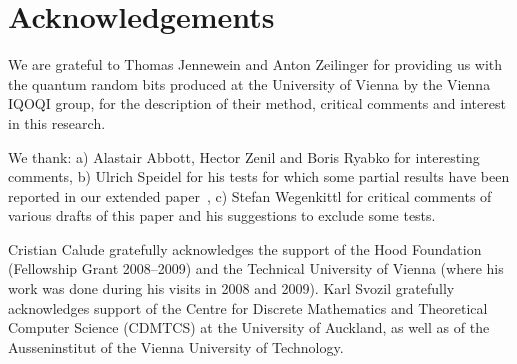 \documentclass[10pt]{article}%
\begin{document}
\section*{Acknowledgements}
We are grateful to  Thomas Jennewein and Anton Zeilinger for providing us with the quantum random bits produced at the University of Vienna by the Vienna IQOQI group, for the description of their method, critical comments and  interest in this research.

We thank: a) Alastair Abbott, Hector Zenil and Boris Ryabko for interesting comments, b)
Ulrich Speidel for his tests for which some partial results have been reported in our extended paper~\cite{CDMTCS372},
c) Stefan Wegenkittl for critical comments of various drafts of this paper and his suggestions  to exclude  some tests.


Cristian Calude gratefully  acknowledges the support of  the Hood Foundation (Fellowship Grant 2008--2009) and the  Technical University of Vienna (where his work was done during his visits in 2008 and 2009).
Karl Svozil  gratefully  acknowledges support of the
Centre for Discrete Mathematics and Theoretical Computer Science (CDMTCS) at the University of Auckland, as well as of the Ausseninstitut of the Vienna University of Technology.





\end{document}
